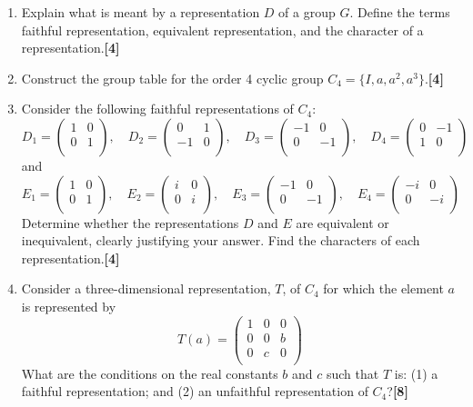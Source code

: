 \documentclass[a4paper]{article}
\begin{document}
\newpage
\begin{qns}\leavevmode
\begin{enumerate}[label=(\roman*)]
\item Explain what is meant by a representation $D$ of a group $G$. Define the terms faithful representation, equivalent representation, and the character of a representation.\hfill\textbf{[4]}
\item Construct the group table for the order 4 cyclic group $C_4=\{I,a,a^2,a^3\}$.\hfill\textbf{[4]}
\item Consider the following faithful representations of $C_4$:
$$D_1=\begin{pmatrix}1&0\\0&1\\\end{pmatrix},\quad D_2=\begin{pmatrix}0&1\\-1&0\\\end{pmatrix},\quad D_3=\begin{pmatrix}-1&0\\0&-1\\\end{pmatrix},\quad D_4=\begin{pmatrix}0&-1\\1&0\\\end{pmatrix}$$
and
$$E_1 =\begin{pmatrix}1&0\\0&1\\\end{pmatrix},\quad E_2 =\begin{pmatrix}i&0\\0&i\\\end{pmatrix},\quad E_3 =\begin{pmatrix}-1&0\\0&-1\\\end{pmatrix},\quad E_4 =\begin{pmatrix}-i&0\\0&-i\\\end{pmatrix}$$
Determine whether the representations $D$ and $E$ are equivalent or inequivalent, clearly justifying your answer. Find the characters of each representation.\hfill\textbf{[4]}
\item Consider a three-dimensional representation, $T$, of $C_4$ for which the element $a$ is represented by
$$T(a)=\begin{pmatrix}1&0&0\\0&0&b\\0&c&0\\\end{pmatrix}$$
What are the conditions on the real constants $b$ and $c$ such that $T$ is: (1) a faithful representation; and (2) an unfaithful representation of $C_4$?\hfill\textbf{[8]}
\end{enumerate}
\end{qns}
\end{document}
